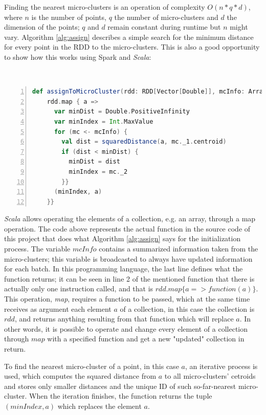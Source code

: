 Finding the nearest micro-clusters is an operation of complexity $O(n*q*d)$, where $n$ is the number of points, $q$ the number of micro-clusters and $d$ the dimension of the points; $q$ and $d$ remain constant during runtime but $n$ might vary. Algorithm \ref{alg:assign} describes a simple search for the minimum distance for every point in the RDD to the micro-clusters. This is also a good opportunity to show how this works using Spark and \textit{Scala}:

\
\begin{lstlisting}[language=Scala, tabsize=2, breaklines=true,basicstyle=\footnotesize,frame=lines,numbers=left]
def assignToMicroCluster(rdd: RDD[Vector[Double]], mcInfo: Array[(MicroClusterInfo, Int)]): RDD[(Int, Vector[Double])] = {
    rdd.map { a =>
      var minDist = Double.PositiveInfinity
      var minIndex = Int.MaxValue
      for (mc <- mcInfo) {
        val dist = squaredDistance(a, mc._1.centroid)
        if (dist < minDist) {
          minDist = dist
          minIndex = mc._2
        }}
      (minIndex, a)
    }}
\end{lstlisting}

\textit{Scala} allows operating the elements of a collection, e.g. an array, through a map operation. The code above represents the actual function in the source code of this project that does what Algorithm \ref{alg:assign} says for the initialization process. The variable $mcInfo$ contains a summarized information taken from the micro-clusters; this variable is broadcasted to always have updated information for each batch. In this programming language, the last line defines what the function returns; it can be seen in line 2 of the mentioned function that there is actually only one instruction called, and that is $rdd.map\{a => function(a) \}$. This operation, \textit{map}, requires a function to be passed, which at the same time receives as argument each element $a$ of a collection, in this case the collection is $rdd$, and returns anything resulting from that function which will replace $a$. In other words, it is possible to operate and change every element of a collection through $map$ with a specified function and get a new "updated" collection in return.

To find the nearest micro-cluster of a point, in this case $a$, an iterative process is used, which computes the squared distance from $a$ to all micro-clusters' cetroids and stores only smaller distances and the unique ID of such so-far-nearest micro-cluster. When the iteration finishes, the function returns the tuple $(minIndex,a)$ which replaces the element $a$.

